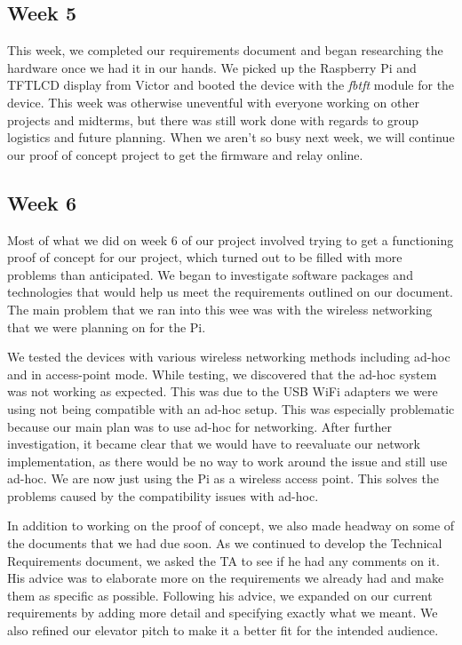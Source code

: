 \documentclass[letterpaper,10pt]{article}
\begin{document}
\subsection{Week 5}

This week, we completed our requirements document and began researching
the hardware once we had it in our hands. We picked up the Raspberry Pi
and TFTLCD display from Victor and booted the device with the \textit{fbtft} 
module for the device. This week was otherwise uneventful with everyone working
on other projects and midterms, but there was still work done with regards to 
group logistics and future planning. When we aren't so busy next week, we will
continue our proof of concept project to get the firmware and relay online.

\subsection{Week 6}
 
Most of what we did on week 6 of our project involved trying to get a
functioning proof of concept for our project, which turned out to be filled
with more problems than anticipated. We began to investigate software packages
and technologies that would help us meet the requirements outlined on our
document. The main problem that we ran into this wee was with the wireless
networking that we were planning on for the Pi.

We tested the devices with various wireless networking methods including ad-hoc
and in access-point mode. While testing, we discovered that the ad-hoc system
was not working as expected. This was due to the USB WiFi adapters we were
using not being compatible with an ad-hoc setup. This was especially
problematic because our main plan was to use ad-hoc for networking. After
further investigation, it became clear that we would have to reevaluate our
network implementation, as there would be no way to work around the issue and
still use ad-hoc. We are now just using the Pi as a wireless access point. This
solves the problems caused by the compatibility issues with ad-hoc.

In addition to working on the proof of concept, we also made headway on some of
the documents that we had due soon. As we continued to develop the Technical
Requirements document, we asked the TA to see if he had any comments on it. His
advice was to elaborate more on the requirements we already had and make them
as specific as possible. Following his advice, we expanded on our current
requirements by adding more detail and specifying exactly what we meant. We
also refined our elevator pitch to make it a better fit for the intended
audience.
\end{document}
